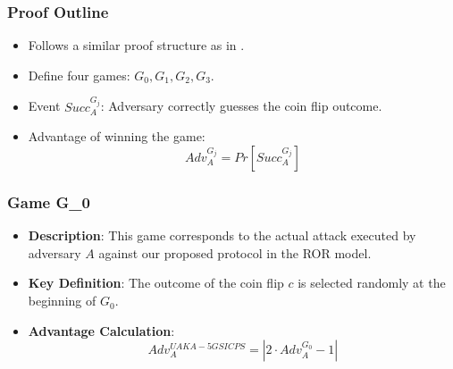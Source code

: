 \documentclass[9pt,handout]{beamer}
\begin{document}
\begin{frame}
    \frametitle{Proof Outline}
    \begin{itemize}
        \item Follows a similar proof structure as in \cite{Chatterjee2018, Roy2018, Wazid2020}.
        \item Define four games: \( G_0, G_1, G_2, G_3 \).
        \item Event \( Succ_A^{G_j} \): Adversary correctly guesses the coin flip outcome.
        \item Advantage of winning the game:
        \[
        Adv_A^{G_j} = Pr[Succ_A^{G_j}]
        \]
    \end{itemize}
\end{frame}
\begin{frame}
    \frametitle{Game G_0}
    \begin{itemize}
        \item \textbf{Description}: This game corresponds to the actual attack executed by adversary \( A \) against our proposed protocol in the ROR model.
        \item \textbf{Key Definition}: The outcome of the coin flip \( c \) is selected randomly at the beginning of \( G_0 \).
        \item \textbf{Advantage Calculation}:
        \[
            Adv_{A}^{UAKA-5GSICPS} = |2 \cdot Adv_{A}^{G_0} - 1|
        \]
    \end{itemize}
\end{frame}
\end{document}
